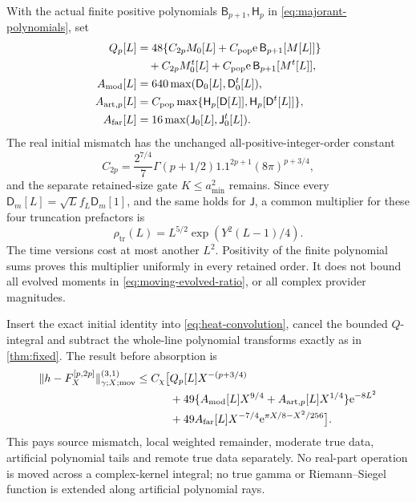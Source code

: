 With the actual finite positive polynomials
\(\mathsf B_{p+1},\mathsf H_p\) in \eqref{eq:majorant-polynomials}, set
\begin{subequations}\label{eq:moving-truncation-constants}
\begin{align}
 Q_p[L]&=48\{C_{2p}M_0[L]
                    +C_{\mathrm{pop}}\mathrm e\,\mathsf B_{p+1}[M[L]]\}
                      \nonumber\\
 &\quad+C_{2p}M_0^t[L]
                    +C_{\mathrm{pop}}\mathrm e\,\mathsf B_{p+1}[M^t[L]],\\
 A_{\mathrm{mod}}[L]&=640\max(\mathsf D_0[L],\mathsf D_0^t[L]),\\
 A_{\mathrm{art},p}[L]&=C_{\mathrm{pop}}
           \max\{\mathsf H_p[\mathsf D[L]],\mathsf H_p[\mathsf D^t[L]]\},\\
 A_{\mathrm{far}}[L]&=16\max(\mathsf J_0[L],\mathsf J_0^t[L]).
\end{align}
\end{subequations}
The real initial mismatch has the unchanged all-positive-integer-order
constant
\[
 C_{2p}=\frac{2^{7/4}}7\Gamma(p+1/2)1.1^{2p+1}(8\pi)^{p+3/4},
\]
and the separate retained-size gate \(K\le a_{\min}^2\) remains.
Since every \(\mathsf D_m[L]=\sqrt L f_L\mathsf D_m[1]\), and the
same holds for \(\mathsf J\), a common multiplier for these four
truncation prefactors is
\begin{equation}
 \rho_{\mathrm{tr}}(L)=L^{5/2}\exp(Y^2(L-1)/4).
 \label{eq:moving-truncation-ratio}
\end{equation}
The time versions cost at most another \(L^2\). Positivity of the finite
polynomial sums proves this multiplier uniformly in every retained
order. It does not bound all evolved moments in
\eqref{eq:moving-evolved-ratio}, or all complex provider magnitudes.

Insert the exact initial identity into \eqref{eq:heat-convolution},
cancel the bounded \(Q\)-integral and subtract the whole-line polynomial
transforms exactly as in \cref{thm:fixed}. The result before absorption is
\begin{align}
 \lVert h-F_X^{[p,2p]}\rVert_{\gamma;X;\mathrm{mov}}^{(3,1)}
 \le C_\chi\bigl[&Q_p[L]X^{-(p+3/4)}\nonumber\\
 &+49\{A_{\mathrm{mod}}[L]X^{9/4}
                 +A_{\mathrm{art},p}[L]X^{1/4}\}\mathrm e^{-8L^2}\nonumber\\
 &+49A_{\mathrm{far}}[L]X^{-7/4}
                                  \mathrm e^{\pi X/8-X^2/256}\bigr].
 \label{eq:moving-unabsorbed}
\end{align}
This pays source mismatch, local weighted remainder, moderate true data,
artificial polynomial tails and remote true data separately. No real-part
operation is moved across a complex-kernel integral; no true gamma or
Riemann--Siegel function is extended along artificial polynomial rays.

